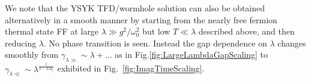 We note that the YSYK TFD/wormhole solution 
can also be obtained alternatively in a smooth manner by starting from the nearly free fermion thermal state FF at large $\lambda \gg g^{2}/\omega_0^2$ but low $T\ll \lambda$ described above, and then reducing $\lambda$. No phase transition is seen. Instead the gap dependence on $\lambda$ changes smoothly from $\gamma_{\lambda \gg} \sim \lambda+\ldots$ as in Fig.\ref{fig:LargeLambdaGapScaling} to $\gamma_{\lambda\ll} \sim \lambda^{\frac{1}{2-2\Delta_f}}$ exhibited in Fig.~\ref{fig:ImagTimeScaling}.


